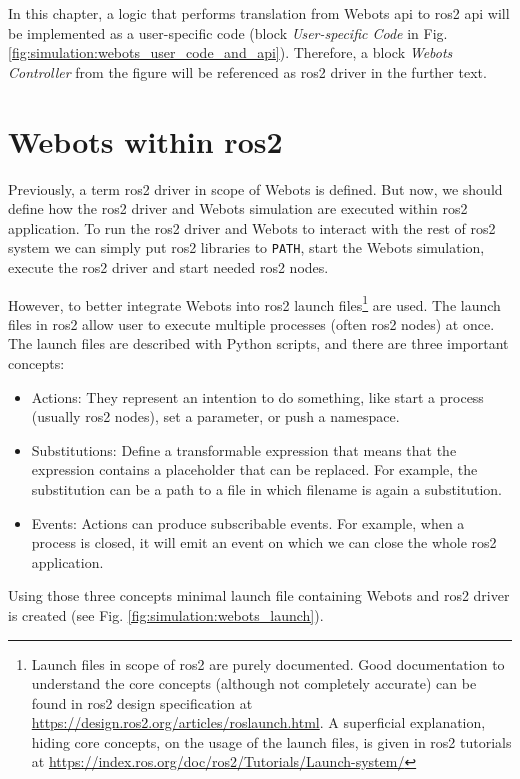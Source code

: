 In this chapter, a logic that performs translation from Webots \ac{api} to \ac{ros2} \ac{api} will be implemented as a user-specific code (block \textit{User-specific Code} in Fig. \ref{fig:simulation:webots_user_code_and_api}).
Therefore, a block \textit{Webots Controller} from the figure will be referenced as \ac{ros2} driver in the further text.

\section{Webots within \ac{ros2}}
Previously, a term \ac{ros2} driver in scope of Webots is defined. But now, we should define how the \ac{ros2} driver and Webots simulation are executed within \ac{ros2} application. To run the \ac{ros2} driver and Webots to interact with the rest of \ac{ros2} system we can simply put \ac{ros2} libraries to \texttt{PATH}, start the Webots simulation, execute the \ac{ros2} driver and start needed \ac{ros2} nodes.

However, to better integrate Webots into \ac{ros2} launch files\footnote{Launch files in scope of \ac{ros2} are purely documented. Good documentation to understand the core concepts (although not completely accurate) can be found in \ac{ros2} design specification at \url{https://design.ros2.org/articles/roslaunch.html}. A superficial explanation, hiding core concepts, on the usage of the launch files, is given in \ac{ros2} tutorials at \url{https://index.ros.org/doc/ros2/Tutorials/Launch-system/}} are used. The launch files in \ac{ros2} allow user to execute multiple processes (often \ac{ros2} nodes) at once. The launch files are described with Python scripts, and there are three important concepts:
\begin{itemize}
    \item Actions: They represent an intention to do something, like start a process (usually \ac{ros2} nodes), set a parameter, or push a namespace. 
    \item Substitutions: Define a transformable expression that means that the expression contains a placeholder that can be replaced. For example, the substitution can be a path to a file in which filename is again a substitution.
    \item Events: Actions can produce subscribable events. For example, when a process is closed, it will emit an event on which we can close the whole \ac{ros2} application.
\end{itemize}

Using those three concepts minimal launch file containing Webots and \ac{ros2} driver is created (see Fig. \ref{fig:simulation:webots_launch}).

